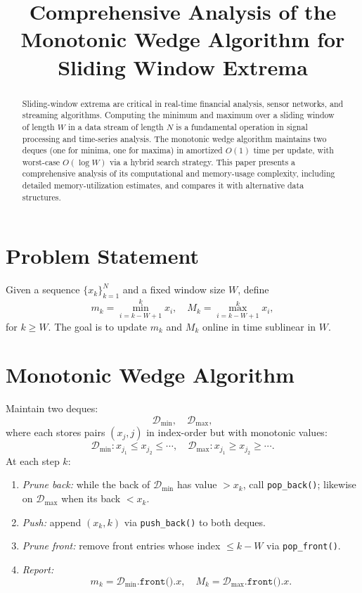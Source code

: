 \documentclass[12pt,letterpaper]{article}
\title{Comprehensive Analysis of the Monotonic Wedge Algorithm for Sliding Window Extrema}
\date{}
\begin{document}
\maketitle

\begin{abstract}
Sliding-window extrema are critical in real-time financial analysis, sensor networks, and streaming algorithms. Computing the minimum and maximum over a sliding window of length \(W\) in a data stream of length \(N\) is a fundamental operation in signal processing and time-series analysis. The monotonic wedge algorithm maintains two deques (one for minima, one for maxima) in amortized \(O(1)\) time per update, with worst-case \(O(\log W)\) via a hybrid search strategy. This paper presents a comprehensive analysis of its computational and memory-usage complexity, including detailed memory-utilization estimates, and compares it with alternative data structures.
\end{abstract}

\section{Problem Statement}
Given a sequence \(\{x_k\}_{k=1}^N\) and a fixed window size \(W\), define
\[
m_k = \min_{i=k-W+1}^k x_i,
\quad
M_k = \max_{i=k-W+1}^k x_i,
\]
for \(k\ge W\). The goal is to update \(m_k\) and \(M_k\) online in time sublinear in \(W\).

\section{Monotonic Wedge Algorithm}
Maintain two deques:
\[
\mathcal{D}_{\min},\quad \mathcal{D}_{\max},
\]
where each stores pairs \((x_j,j)\) in index-order but with monotonic values:
\[
\mathcal{D}_{\min}: x_{j_1}\le x_{j_2}\le\cdots,
\quad
\mathcal{D}_{\max}: x_{j_1}\ge x_{j_2}\ge\cdots.
\]
At each step \(k\):
\begin{enumerate}
  \item \emph{Prune back:} while the back of \(\mathcal{D}_{\min}\) has value \(>x_k\), call \texttt{pop\_back()}; likewise on \(\mathcal{D}_{\max}\) when its back \(<x_k\).
  \item \emph{Push:} append \((x_k,k)\) via \texttt{push\_back()} to both deques.
  \item \emph{Prune front:} remove front entries whose index \(\le k-W\) via \texttt{pop\_front()}.
  \item \emph{Report:}  
    \[
      m_k = \mathcal{D}_{\min}\!\texttt{.front()}\!.x,
      \quad
      M_k = \mathcal{D}_{\max}\!\texttt{.front()}\!.x.
    \]
\end{enumerate}
\end{document}
